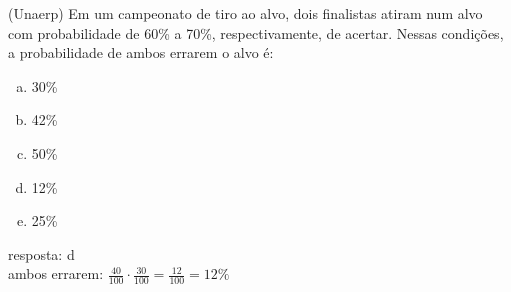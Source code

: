 \begin{ex}
 (Unaerp) Em um campeonato de tiro ao alvo, dois finalistas atiram num alvo com probabilidade de 60\% a 70\%, respectivamente, de acertar. Nessas condições, a probabilidade de ambos errarem o alvo é:
    \begin{enumerate}[(a)]
    \item 30\%
    \item 42\%
    \item 50\%
    \item 12\%
    \item 25\%
    \end{enumerate}
      \begin{sol}
      resposta: d \\
      ambos errarem: $\frac{40}{100}\cdot\frac{30}{100}=\frac{12}{100}=12\%$
      \end{sol}
\end{ex}